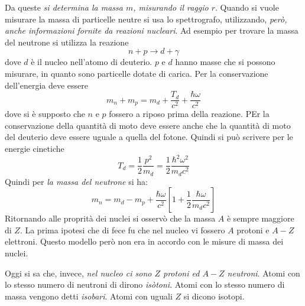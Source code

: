Da queste \textit{si determina la massa $m$, misurando il raggio $r$}. Quando si
vuole misurare la massa di particelle neutre si usa lo spettrografo,
utilizzando, \textit{però, anche informazioni fornite da reazioni nucleari}. Ad
esempio per trovare la massa del neutrone si utilizza la reazione
\begin{equation}
n + p \longrightarrow d + \gamma
\end{equation}
dove $d$ è il nucleo nell'atomo di deuterio.
$p$ e $d$ hanno masse che si possono misurare, in quanto sono particelle dotate
di carica. Per la conservazione dell'energia deve essere
\begin{equation}
m_{n} + m_{p} = m_{d} + \dfrac{T_{d}}{c^{2}} + \dfrac{\hbar \omega}{c^{2}}
\end{equation}
dove si è supposto che $n$ e $p$ fossero a riposo prima della reazione. PEr la
conservazione della quantità di moto deve essere anche che la quantità di moto
del deuterio deve essere uguale a quella del fotone. Quindi si può scrivere per
le energie cinetiche
\begin{equation}
T_{d} = \dfrac{1}{2} \dfrac{p^{2}}{m_{d}} = \dfrac{1}{2} \dfrac{\hbar ^{2} \omega ^{2}}{m_{d} c^{2}}
\end{equation}
Quindi per \textit{la massa del neutrone} si ha:
\begin{equation}
m_{n} = m_{d} - m_{p} + \dfrac{\hbar \omega}{c^{2}} \left[1 + \dfrac{1}{2} \dfrac{\hbar \omega}{m_{d} c^{2}} \right]
\end{equation}
Ritornando alle proprità dei nuclei si osservò che la massa $A$ è sempre
maggiore di $Z$. La prima ipotesi che di fece fu che nel nucleo vi fossero $A$
protoni e $A-Z$ elettroni. Questo modello però non era in accordo con le misure
di massa dei nuclei.

Oggi si sa che, invece, \textit{nel nucleo ci sono $Z$ protoni ed $A-Z$
neutroni}. Atomi con lo stesso numero di neutroni di dirono \textit{isòtoni}.
Atomi con lo stesso numero di massa vengono detti \textit{isobari}. Atomi con
uguali $Z$ si dicono isotopi.

